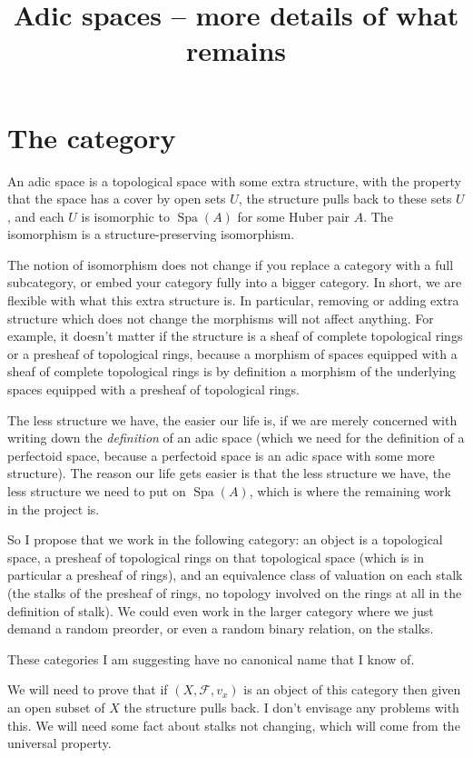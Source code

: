 \documentclass{amsart}
\DeclareMathOperator{\Spa}{Spa}
\theoremstyle{plain}
\theoremstyle{remark}
\begin{document}
\title{Adic spaces -- more details of what remains}

\section{The category}

An adic space is a topological space with some extra structure, with the property that the space has a cover by open sets $U$, the structure pulls back to these sets $U$, and each $U$ is isomorphic to $\Spa(A)$ for some Huber pair $A$. The isomorphism is a structure-preserving isomorphism.

The notion of isomorphism does not change if you replace a category with a full subcategory, or embed your category fully into a bigger category. In short, we are flexible with what this extra structure is. In particular, removing or adding extra structure which does not change the morphisms will not affect anything. For example, it doesn't matter if the structure is a sheaf of complete topological rings or a presheaf of topological rings, because a morphism of spaces equipped with a sheaf of complete topological rings is by definition a morphism of the underlying spaces equipped with a presheaf of topological rings.

The less structure we have, the easier our life is, if we are merely concerned with writing down the \emph{definition} of an adic space (which we need for the definition of a perfectoid space, because a perfectoid space is an adic space with some more structure). The reason our life gets easier is that the less structure we have, the less structure we need to put on $\Spa(A)$, which is where the remaining work in the project is.

So I propose that we work in the following category: an object is a topological space, a presheaf of topological rings on that topological space (which is in particular a presheaf of rings), and an equivalence class of valuation on each stalk (the stalks of the presheaf of rings, no topology involved on the rings at all in the definition of stalk). We could even work in the larger category where we just demand a random preorder, or even a random binary relation, on the stalks.

These categories I am suggesting have no canonical name that I know of.

We will need to prove that if $(X,\mathcal{F},v_x)$ is an object of this category then given an open subset of $X$ the structure pulls back. I don't envisage any problems with this. We will need some fact about stalks not changing, which will come from the universal property.
\end{document}
